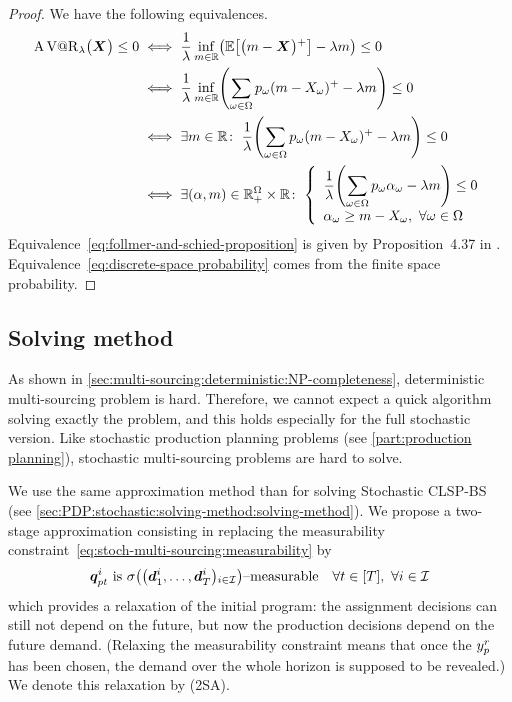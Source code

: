 \begin{proof}
We have the following equivalences.
\begin{subequations}
  \begin{align}
    \ds\AVaR_{\lambda}\bracket{\va X} \le 0 &\ds\iff \frac{1}{\lambda} \inf_{m\in\RR}\bracket{\espe\sqbracket{\bracket{m-\va X}^+}-\lambda m} \le 0
    \label{eq:follmer-and-schied-proposition}
    \\
    &\ds\iff \frac{1}{\lambda} \inf_{m\in\RR}\bracket{\sum_{\omega\in\Omega}p_{\omega}\bracket{m-X_{\omega}}^+ - \lambda m} \le 0
    \label{eq:discrete-space probability}
    \\
    &\ds\iff \exists m\in\RR \colon\; \frac{1}{\lambda}    \bracket{ \sum_{\omega\in\Omega}p_{\omega}\bracket{m-X_{\omega} }^+ - \lambda m} \le 0
    \\
    &\ds\iff \exists \bracket{\alpha,m}\in\RR_+^{\Omega}\times\RR\colon\;
    \left\{
      \begin{array}{l}
        \ds\frac{1}{\lambda}\bracket{\sum_{\omega\in\Omega}p_{\omega}\alpha_{\omega}-\lambda m} \le 0 \\
        \ds\alpha_{\omega}\ge m-X_{\omega},\ \forall\omega\in\Omega
      \end{array}
    \right.
  \end{align}
\end{subequations}
Equivalence~\eqref{eq:follmer-and-schied-proposition} is given by Proposition~4.37 in \cite{Follmer2004}.
Equivalence~\eqref{eq:discrete-space probability} comes from the finite space probability.
\end{proof}


\subsection{Solving method}
\label{sec:multi-sourcing:stochastic:solving-method:solving-method}


As shown in \cref{sec:multi-sourcing:deterministic:NP-completeness}, deterministic multi-sourcing problem is hard.
Therefore, we cannot expect a quick algorithm solving exactly the problem, and this holds especially for the full stochastic version.
Like stochastic production planning problems (see \cref{part:production planning}), stochastic multi-sourcing problems are hard to solve.


We use the same approximation method than for solving Stochastic CLSP-BS (see \cref{sec:PDP:stochastic:solving-method:solving-method}).
We propose a two-stage approximation consisting in replacing the measurability constraint~\eqref{eq:stoch-multi-sourcing:measurability} by
\begin{equation}
\va\quantity_{pt}^i\ \mbox{is}\ \Sfield{\bracket{\va\demand_1^i,\ldots,\va\demand_{\horizon}^i}_{i\in\REF}}\mbox{--measurable} \quad \forall t\in\range{\horizon},\ \forall i\in\REF
\end{equation}
which provides a relaxation of the initial program: the assignment decisions can still not depend on the future, but now the production decisions depend on the future demand.
(Relaxing the measurability constraint means that once the $y_p^r$ has been chosen, the demand over the whole horizon is supposed to be revealed.)
We denote this relaxation by (2SA).


